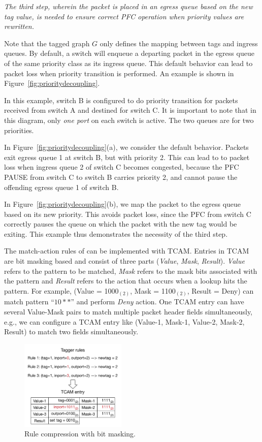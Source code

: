 {\em The third step, wherein the packet is placed in an egress queue based on the
{\em new} tag value, is needed to ensure correct PFC operation when priority
values are rewritten.}

Note that the tagged graph $G$ only defines the mapping between tags and ingress
queues. By default, a switch will enqueue a departing packet in the egress queue
of the same priority class as its ingress queue. This default behavior can lead
to packet loss when priority transition is performed. An example is shown in
Figure~\ref{fig:prioritydecoupling}. 
 
In this example, switch B is configured to do priority transition for packets
received from switch A and destined for switch C. It is important to note that
in this diagram, only {\em one port} on each switch is active. The two queues
are for two priorities.
 
In Figure~\ref{fig:prioritydecoupling}(a), we consider the default behavior.
Packets exit egress queue 1 at switch B, but with priority 2.  This can lead to
to packet loss when ingress queue 2 of switch C becomes congested, because 
the PFC PAUSE from switch C to switch B carries priority 2, and cannot pause 
the offending egress queue 1 of switch B. 
 
In Figure~\ref{fig:prioritydecoupling}(b), we map the packet to the egress queue
based on its new priority.  This avoids packet loss, since the PFC from switch C
correctly pauses the queue on which the packet with the new tag would be
exiting. This example thus demonstrates the necessity of the third step.

  The match-action rules of
\sysname{} can be implemented with TCAM. Entries in TCAM are bit masking based
and consist of three parts ({\em Value}, {\em Mask}, {\em Result}). {\em Value}
refers to the pattern to be matched, {\em Mask} refers to the mask bits
associated with the pattern and {\em Result} refers to the action that occurs
when a lookup hits the pattern. For example, (Value = 1000$_{(2)}$, Mask =
1100$_{(2)}$, Result = Deny) can match pattern ``$10**$'' and perform {\em Deny}
action. One TCAM entry can have several Value-Mask pairs to match multiple
packet header fields simultaneously, e.g., we can configure a TCAM entry like
(Value-1, Mask-1, Value-2, Mask-2, Result) to match two fields simultaneously.

\begin{figure}
	\centering
	\includegraphics[width=0.45\textwidth] {figs/compression_with_bitmasking}
	\caption{Rule compression with bit masking.}\label{fig:compression}
	
\end{figure}

